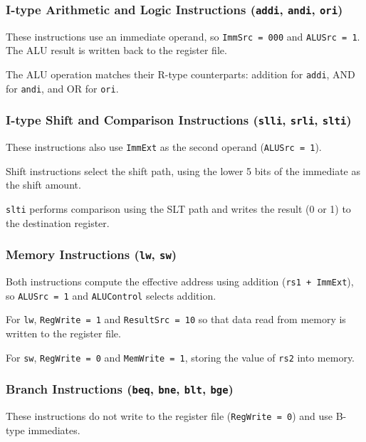 \documentclass[acmsmall]{acmart}
\begin{document}
\subsubsection{I-type Arithmetic and Logic Instructions (\texttt{addi}, \texttt{andi}, \texttt{ori})}

These instructions use an immediate operand, so \texttt{ImmSrc = 000} and \texttt{ALUSrc = 1}. The ALU result is written back to the register file.

The ALU operation matches their R-type counterparts: addition for \texttt{addi}, AND for \texttt{andi}, and OR for \texttt{ori}.

\subsubsection{I-type Shift and Comparison Instructions (\texttt{slli}, \texttt{srli}, \texttt{slti})}

These instructions also use \texttt{ImmExt} as the second operand (\texttt{ALUSrc = 1}).

Shift instructions select the shift path, using the lower 5 bits of the immediate as the shift amount.  

\texttt{slti} performs comparison using the SLT path and writes the result (0 or 1) to the destination register.

\subsubsection{Memory Instructions (\texttt{lw}, \texttt{sw})}

Both instructions compute the effective address using addition (\texttt{rs1 + ImmExt}), so \texttt{ALUSrc = 1} and \texttt{ALUControl} selects addition.

For \texttt{lw}, \texttt{RegWrite = 1} and \texttt{ResultSrc = 10} so that data read from memory is written to the register file.  

For \texttt{sw}, \texttt{RegWrite = 0} and \texttt{MemWrite = 1}, storing the value of \texttt{rs2} into memory.

\subsubsection{Branch Instructions (\texttt{beq}, \texttt{bne}, \texttt{blt}, \texttt{bge})}

These instructions do not write to the register file (\texttt{RegWrite = 0}) and use B-type immediates.
\end{document}
